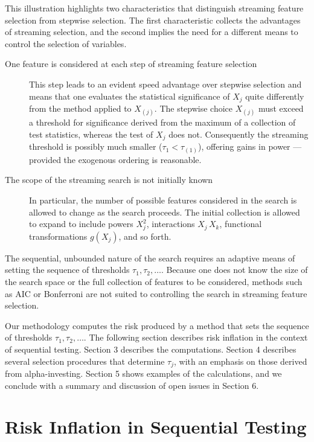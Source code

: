 \documentclass[12pt]{article}
\begin{document}
 This illustration highlights two characteristics that distinguish streaming
 feature selection from stepwise selection.  The first characteristic collects
 the advantages of streaming selection, and the second implies the need for a
 different means to control the selection of variables.
 \begin{description}
  \item[One feature is considered at each step of streaming feature selection]
 This step leads to an evident speed advantage over stepwise selection and means
 that one evaluates the statistical significance of $X_j$ quite differently from
 the method applied to $X_{(j)}$.  The stepwise choice $X_{(j)}$ must exceed a
 threshold for significance derived from the maximum of a collection of test
 statistics, whereas the test of $X_j$ does not. Consequently the streaming
 threshold is possibly much smaller ($\tau_1 < \tau_{(1)}$), offering gains in
 power --- provided the exogenous ordering is reasonable.
  \item[The scope of the streaming search is not initially known] In particular,
 the number of possible features considered in the search is allowed to change
 as the search proceeds.  The initial collection is allowed to expand to include
 powers $X_j^2$, interactions $X_j\,X_k$, functional transformations $g(X_j)$,
 and so forth.
 \end{description}
 The sequential, unbounded nature of the search requires an adaptive means of
 setting the sequence of thresholds $\tau_1, \tau_2, \ldots$.  Because one does
 not know the size of the search space or the full collection of features to be
 considered, methods such as AIC or Bonferroni are not suited to controlling the
 search in streaming feature selection.


 Our methodology computes the risk produced by a method that sets the sequence
 of thresholds $\tau_1, \tau_2, \ldots$.  The following section describes risk
 inflation in the context of sequential testing.  Section 3 describes the
 computations.  Section 4 describes several selection procedures that determine
 $\tau_j$, with an emphasis on those derived from alpha-investing.  Section 5
 shows examples of the calculations, and we conclude with a summary and
 discussion of open issues in Section 6.


\section{ Risk Inflation in Sequential Testing }
\end{document}
